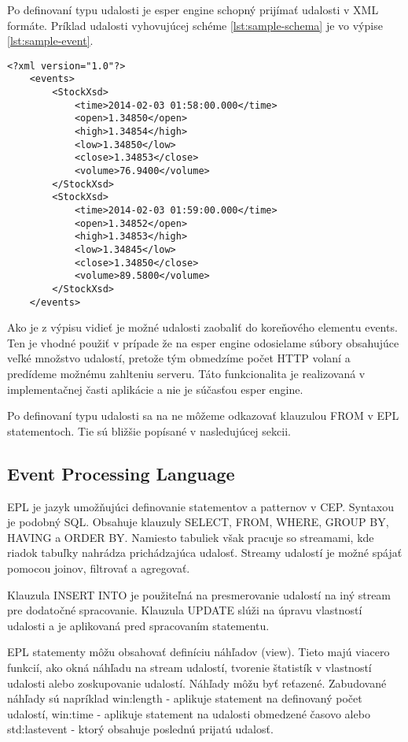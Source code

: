 	Po definovaní typu udalosti je esper engine schopný prijímať udalosti v XML formáte. Príklad udalosti vyhovujúcej schéme \ref{lst:sample-schema} je vo výpise \ref{lst:sample-event}.
	\begin{lstlisting}[label=lst:sample-schema,caption=Príklad XML udalosti]
	<?xml version="1.0"?>
	<events>
		<StockXsd>
			<time>2014-02-03 01:58:00.000</time>
			<open>1.34850</open>
			<high>1.34854</high>
			<low>1.34850</low>
			<close>1.34853</close>
			<volume>76.9400</volume>
		</StockXsd>
		<StockXsd>
			<time>2014-02-03 01:59:00.000</time>
			<open>1.34852</open>
			<high>1.34853</high>
			<low>1.34845</low>
			<close>1.34850</close>
			<volume>89.5800</volume>
		</StockXsd>
	</events>
	\end{lstlisting}
	Ako je z výpisu vidieť je možné udalosti zaobaliť do koreňového elementu events. Ten je vhodné použiť v prípade že na esper engine odosielame súbory obsahujúce veľké množstvo udalostí, pretože tým obmedzíme počet HTTP volaní a predídeme možnému zahlteniu serveru. Táto funkcionalita je realizovaná v implementačnej časti aplikácie a nie je súčasťou esper engine.

	Po definovaní typu udalosti sa na ne môžeme odkazovať klauzulou FROM v EPL statementoch. Tie sú bližšie popísané v nasledujúcej sekcii.

	\subsection{Event Processing Language}
		\ac{EPL} je jazyk umožňujúci definovanie statementov a patternov v CEP. Syntaxou je podobný SQL. Obsahuje klauzuly SELECT, FROM, WHERE, GROUP BY, HAVING a ORDER BY. Namiesto tabuliek však pracuje so streamami, kde riadok tabuľky nahrádza prichádzajúca udalosť. Streamy udalostí je možné spájať pomocou joinov, filtrovať a agregovať.
		
		Klauzula INSERT INTO je použiteľná na presmerovanie udalostí na iný stream pre dodatočné spracovanie. Klauzula UPDATE slúži na úpravu vlastností udalosti a je aplikovaná pred spracovaním statementu. 
		
		EPL statementy môžu obsahovať definíciu náhľadov (view). Tieto majú viacero funkcií, ako okná náhľadu na stream udalostí, tvorenie štatistík v vlastností udalosti alebo zoskupovanie udalostí. Náhľady môžu byť reťazené. Zabudované náhľady sú napríklad win:length - aplikuje statement na definovaný počet udalostí, win:time - aplikuje statement na udalosti obmedzené časovo alebo std:lastevent - ktorý obsahuje poslednú prijatú udalosť.
		
